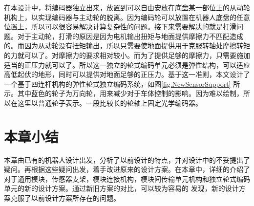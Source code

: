 在本设计中，将编码器独立出来，放置到可以自由安放在底盘某一部位上的从动轮机构上，以实现编码器与主动轮的脱离。因为编码轮可以放置在机器人底盘的任意位置上，所以可以很容易解决计算复杂性的问题。接下来需要解决的就是打滑问题。对于主动轮，打滑的原因是因为电机输出扭矩与地面提供摩擦力不匹配造成的。而因为从动轮没有扭矩输出，所以只需要使地面提供用于克服转轴处摩擦转矩的力就可以了。对摩擦力的要求相对较小。而为了提供足够的摩擦力，只需要施加适当的正压力就可以了。所以这一独立的轮式编码单元必须是弹性结构，可以适应高低起伏的地形，同时可以提供对地面足够的正压力。基于这一准则，本文设计了一个基于四连杆机构的弹性轮式独立编码系统，如图\ref{fig.NewSensorSupport} 所示。其中蓝色的轮子为万向轮，用来减少对于车体控制的影响。因为难以绘制，所以在这里以普通轮子表示。一段比较长的轮轴上固定光学编码器。
\begin{figure}
  \centering
\end{figure}
\section{本章小结}
本章由已有的机器人设计出发，分析了以前设计的特点，并对设计中的不妥提出了疑问。再根据这些疑问出发，着手改进原来的设计方案。在本章中，详细的介绍了对于通用模块，传感器支架，模块连接机构，模块间传输单元机构和独立轮式编码单元的新的设计方案。通过新旧方案的对比，可以较为容易的 发现，新的设计方案克服了以前设计方案所存在的问题。
